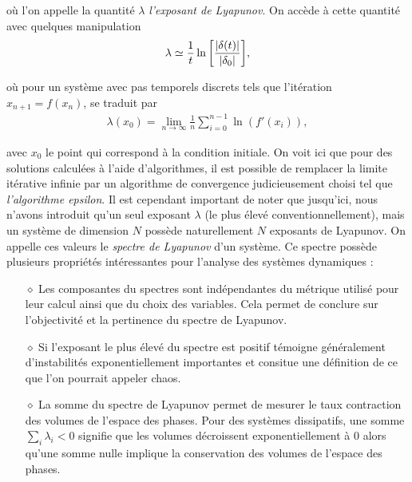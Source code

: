     où l'on appelle la quantité $\lambda$ \textit{l'exposant de Lyapunov}. On
    accède à cette quantité avec quelques manipulation
    \begin{align}
        \lambda \simeq
        \frac{1}{t}\ln\qty[\frac{|\mathbf{\delta}(t)|}{|\mathbf{\delta}_0|}],
    \end{align}

    où pour un système avec pas temporels discrets tels que l'itération
    $x_{n + 1} = f(x_n)$, se traduit par
    \begin{align}
        \lambda(x_0) = \lim_{n\to\infty}\frac{1}{n}\sum_{i = 0}^{n - 1}\ln(f'(x_i)),
    \end{align}

    avec $x_0$ le point qui correspond à la condition initiale. On voit ici
    que pour des solutions calculées à l'aide d'algorithmes, il est possible
    de remplacer la limite itérative infinie par un algorithme de convergence
    judicieusement choisi tel que \textit{l'algorithme epsilon}. Il est
    cependant important de noter que jusqu'ici, nous n'avons introduit qu'un
    seul exposant $\lambda$ (le plus élevé conventionnellement), mais un
    système de dimension $N$ possède naturellement $N$ exposants de Lyapunov.
    On appelle ces valeurs le \textit{spectre de Lyapunov} d'un système. Ce
    spectre possède plusieurs propriétés intéressantes pour l'analyse des
    systèmes dynamiques \cite{LEs}: \\
    \begin{itemize}
        \item[$\diamond$] Les composantes du spectres sont indépendantes du
            métrique utilisé pour leur calcul ainsi que du choix des variables.
            Cela permet de conclure sur l'objectivité et la pertinence du
            spectre de Lyapunov. \\
        \item[$\diamond$] Si l'exposant le plus élevé du spectre est positif
            témoigne généralement d'instabilités exponentiellement importantes
            et consitue une définition de ce que l'on pourrait appeler chaos. \\
        \item[$\diamond$] La somme du spectre de Lyapunov permet de mesurer
            le taux contraction des volumes de l'espace des phases. Pour des
            systèmes dissipatifs, une somme $\sum_i\lambda_i < 0$ signifie que
            les volumes décroissent exponentiellement à 0 alors qu'une somme
            nulle implique la conservation des volumes de l'espace des phases.
    \end{itemize}
